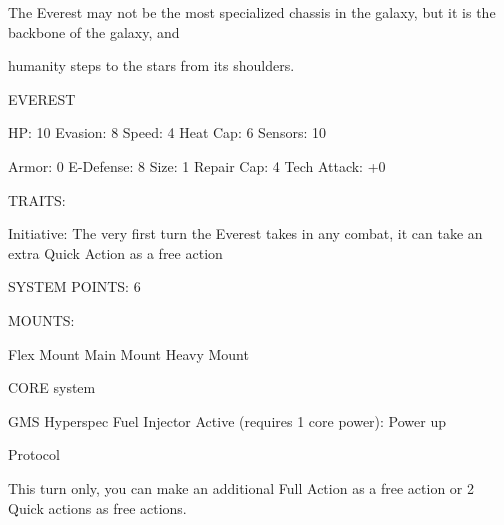 The Everest may not be the most specialized chassis in the galaxy, but it is the backbone of the galaxy, and

humanity steps to the stars from its shoulders.


                                                      EVEREST

  HP: 10          Evasion: 8                                Speed: 4             Heat Cap: 6          Sensors: 10

 Armor: 0         E-Defense: 8                              Size: 1              Repair Cap: 4        Tech Attack:
                                                                                                      +0

                                                        TRAITS:

  Initiative: The very first turn the Everest takes in any combat, it can take an extra Quick Action as a free
 action

                                                 SYSTEM POINTS: 6




                                                 MOUNTS:

Flex Mount                        Main Mount                            Heavy Mount

                                              CORE system

                                      GMS Hyperspec Fuel Injector
Active (requires 1 core power): Power up

Protocol

This turn only, you can make an additional Full Action as a free action or 2 Quick actions as free
actions.